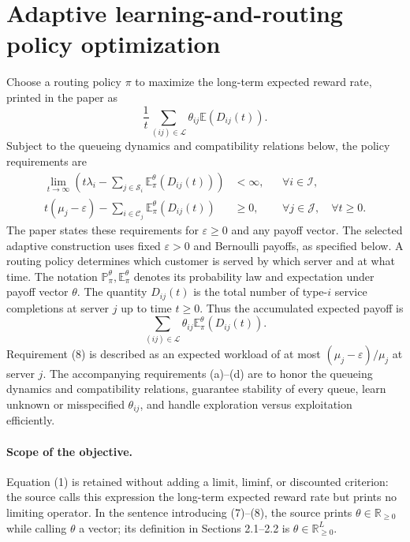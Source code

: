 \documentclass{article}
\begin{document}
\section*{Adaptive learning-and-routing policy optimization}

Choose a routing policy $\pi$ to maximize the long-term expected reward rate, printed in the paper as
\begin{equation}
\frac{1}{t}\sum_{(ij)\in\mathcal L}\theta_{ij}\mathbb E(D_{ij}(t)).
\tag{1}
\end{equation}
Subject to the queueing dynamics and compatibility relations below, the policy requirements are
\begin{align}
\lim_{t\to\infty}\left(t\lambda_i-\sum_{j\in\mathcal S_i}\mathbb E^\theta_\pi(D_{ij}(t))\right)&<\infty,
&&\forall i\in\mathcal I,\tag{7}\\
t(\mu_j-\varepsilon)-\sum_{i\in\mathcal C_j}\mathbb E^\theta_\pi(D_{ij}(t))&\geq0,
&&\forall j\in\mathcal J,\quad\forall t\geq0.\tag{8}
\end{align}
The paper states these requirements for $\varepsilon\geq0$ and any payoff vector. The selected adaptive construction uses fixed $\varepsilon>0$ and Bernoulli payoffs, as specified below. A routing policy determines which customer is served by which server and at what time. The notation $\mathbb P^\theta_\pi,\mathbb E^\theta_\pi$ denotes its probability law and expectation under payoff vector $\theta$. The quantity $D_{ij}(t)$ is the total number of type-$i$ service completions at server $j$ up to time $t\geq0$. Thus the accumulated expected payoff is
\begin{equation}
\sum_{(ij)\in\mathcal L}\theta_{ij}\mathbb E^\theta_\pi(D_{ij}(t)).
\tag{9}
\end{equation}
Requirement (8) is described as an expected workload of at most $(\mu_j-\varepsilon)/\mu_j$ at server $j$. The accompanying requirements (a)--(d) are to honor the queueing dynamics and compatibility relations, guarantee stability of every queue, learn unknown or misspecified $\theta_{ij}$, and handle exploration versus exploitation efficiently.

\paragraph{Scope of the objective.}
Equation (1) is retained without adding a limit, liminf, or discounted criterion: the source calls this expression the long-term expected reward rate but prints no limiting operator. In the sentence introducing (7)--(8), the source prints $\theta\in\mathbb R_{\geq0}$ while calling $\theta$ a vector; its definition in Sections 2.1--2.2 is $\theta\in\mathbb R_{\geq0}^{L}$.
\end{document}

